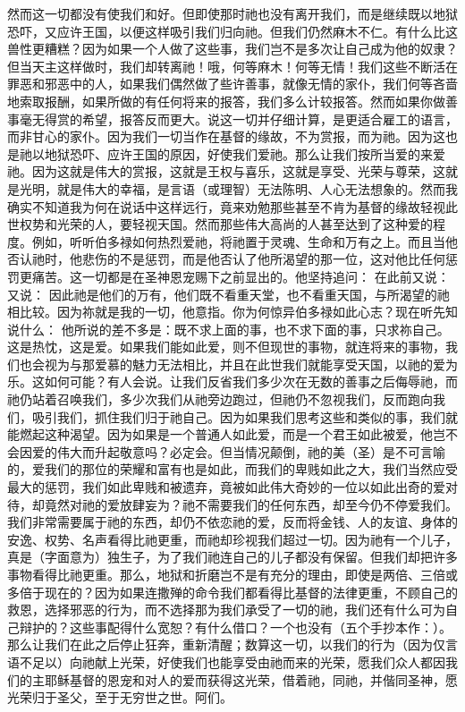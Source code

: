 然而这一切都没有使我们和好。但即使那时祂也没有离开我们，而是继续既以地狱恐吓，又应许王国，以便这样吸引我们归向祂。但我们仍然麻木不仁。有什么比这兽性更糟糕？因为如果一个人做了这些事，我们岂不是多次让自己成为他的奴隶？但当天主这样做时，我们却转离祂！哦，何等麻木！何等无情！我们这些不断活在罪恶和邪恶中的人，如果我们偶然做了些许善事，就像无情的家仆，我们何等吝啬地索取报酬，如果所做的有任何将来的报答，我们多么计较报答。然而如果你做善事毫无得赏的希望，报答反而更大。说这一切并仔细计算，是更适合雇工的语言，而非甘心的家仆。因为我们一切当作在基督的缘故，不为赏报，而为祂。因为这也是祂以地狱恐吓、应许王国的原因，好使我们爱祂。那么让我们按所当爱的来爱祂。因为这就是伟大的赏报，这就是王权与喜乐，这就是享受、光荣与尊荣，这就是光明，就是伟大的幸福，是言语（或理智）无法陈明、人心无法想象的。然而我确实不知道我为何在说话中这样远行，竟来劝勉那些甚至不肯为基督的缘故轻视此世权势和光荣的人，要轻视天国。然而那些伟大高尚的人甚至达到了这种爱的程度。例如，听听伯多禄如何热烈爱祂，将祂置于灵魂、生命和万有之上。而且当他否认祂时，他悲伤的不是惩罚，而是他否认了他所渴望的那一位，这对他比任何惩罚更痛苦。这一切都是在圣神恩宠赐下之前显出的。他坚持追问： 在此前又说： 又说： 因此祂是他们的万有，他们既不看重天堂，也不看重天国，与所渴望的祂相比较。因为祢就是我的一切，他意指。你为何惊异伯多禄如此心志？现在听先知说什么： 他所说的差不多是：既不求上面的事，也不求下面的事，只求祢自己。这是热忱，这是爱。如果我们能如此爱，则不但现世的事物，就连将来的事物，我们也会视为与那爱慕的魅力无法相比，并且在此世我们就能享受天国，以祂的爱为乐。这如何可能？有人会说。让我们反省我们多少次在无数的善事之后侮辱祂，而祂仍站着召唤我们，多少次我们从祂旁边跑过，但祂仍不忽视我们，反而跑向我们，吸引我们，抓住我们归于祂自己。因为如果我们思考这些和类似的事，我们就能燃起这种渴望。因为如果是一个普通人如此爱，而是一个君王如此被爱，他岂不会因爱的伟大而升起敬意吗？必定会。但当情况颠倒，祂的美（圣）是不可言喻的，爱我们的那位的荣耀和富有也是如此，而我们的卑贱如此之大，我们当然应受最大的惩罚，我们如此卑贱和被遗弃，竟被如此伟大奇妙的一位以如此出奇的爱对待，却竟然对祂的爱放肆妄为？祂不需要我们的任何东西，却至今仍不停爱我们。我们非常需要属于祂的东西，却仍不依恋祂的爱，反而将金钱、人的友谊、身体的安逸、权势、名声看得比祂更重，而祂却珍视我们超过一切。因为祂有一个儿子，真是（字面意为）独生子，为了我们祂连自己的儿子都没有保留。但我们却把许多事物看得比祂更重。那么，地狱和折磨岂不是有充分的理由，即使是两倍、三倍或多倍于现在的？因为如果连撒殚的命令我们都看得比基督的法律更重，不顾自己的救恩，选择邪恶的行为，而不选择那为我们承受了一切的祂，我们还有什么可为自己辩护的？这些事配得什么宽恕？有什么借口？一个也没有（五个手抄本作：）。那么让我们在此之后停止狂奔，重新清醒；数算这一切，以我们的行为（因为仅言语不足以）向祂献上光荣，好使我们也能享受由祂而来的光荣，愿我们众人都因我们的主耶稣基督的恩宠和对人的爱而获得这光荣，借着祂，同祂，并偕同圣神，愿光荣归于圣父，至于无穷世之世。阿们。\par

